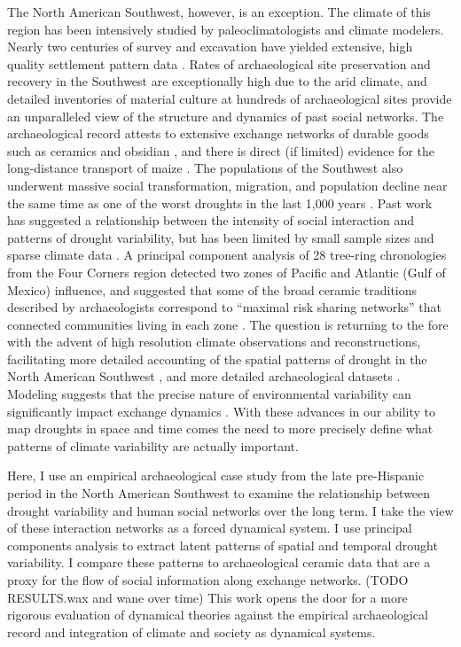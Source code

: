 \documentclass[10pt]{iopart}
\begin{document}
The North American Southwest, however, is an exception. The climate of this region has been intensively studied by paleoclimatologists and climate modelers. Nearly two centuries of survey and excavation have yielded extensive, high quality settlement pattern data \parencite{Hill2004}. Rates of archaeological site preservation and recovery in the Southwest are exceptionally high due to the arid climate, and detailed inventories of material culture at hundreds of archaeological sites provide an unparalleled view of the structure and dynamics of past social networks. The archaeological record attests to extensive exchange networks of durable goods such as ceramics and obsidian \parencite{Taliaferro2010,Mills2013a}, and there is direct (if limited) evidence for the long-distance transport of maize \parencite{Benson2009,Benson2010}. The populations of the Southwest also underwent massive social transformation, migration, and population decline near the same time as one of the worst droughts in the last 1,000 years \parencite{Hill2004}. Past work has suggested a relationship between the intensity of social interaction and patterns of drought variability, but has been limited by small sample sizes and sparse climate data \parencite{Rautman1993a,Johnson1990ChumashAnalysis}. A principal component analysis of 28 tree-ring chronologies from the Four Corners region detected two zones of Pacific and Atlantic (Gulf of Mexico) influence, and suggested that some of the broad ceramic traditions described by archaeologists correspond to ``maximal risk sharing networks'' that connected communities living in each zone \parencite{Cordell2007}. The question is returning to the fore with the advent of high resolution climate observations and reconstructions, facilitating more detailed accounting of the spatial patterns of drought in the North American Southwest \parencite{Strawhacker2017RiskProvince}, and more detailed archaeological datasets \parencite{Borck2015}. Modeling suggests that the precise nature of environmental variability can significantly impact exchange dynamics \parencite{Freeman2014}. With these advances in our ability to map droughts in space and time comes the need to more precisely define what patterns of climate variability are actually important.

Here, I use an empirical archaeological case study from the late pre-Hispanic period in the North American Southwest to examine the relationship between drought variability and human social networks over the long term. I take the view of these interaction networks as a forced dynamical system. I use principal components analysis to extract latent patterns of spatial and temporal drought variability. I compare these patterns to archaeological ceramic data that are a proxy for the flow of social information along exchange networks. (TODO RESULTS.wax and wane over time) This work opens the door for a more rigorous evaluation of dynamical theories against the empirical archaeological record and integration of climate and society as dynamical systems. 
\end{document}
